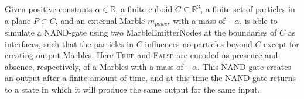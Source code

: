 \begin{lemma}
    Given positive constants $\alpha \in \mathbb{R}$, a finite cuboid $C \subseteq \mathbb{R}^3$, 
    a finite set of particles in a plane $P \subset C$, and an external Marble $m_{power}$ with a mass of $-\alpha$, 
    \nenwin is able to simulate a NAND-gate using two MarbleEmitterNodes at the boundaries of $C$ as interfaces, 
    such that the particles in $C$ influences no particles beyond $C$ except for creating output Marbles. 
    Here \textsc{True} and \textsc{False} are encoded as presence and absence, respectively, 
    of a Marbles with a mass of $+\alpha$. 
    This NAND-gate creates an output after a finite amount of time, 
    and at this time the NAND-gate returns to a state in which it will produce the same output for the same input.
    \label{lemma:nand_with_iface}
\end{lemma}
